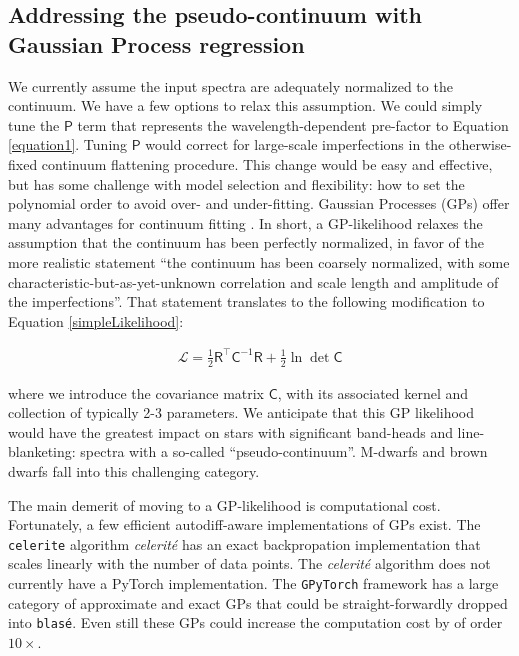 \documentclass[twocolumn]{aastex631}
\begin{document}
\subsection{Addressing the pseudo-continuum with Gaussian Process regression}

We currently assume the input spectra are adequately normalized to the continuum.  We have a few options to relax this assumption.  We could  simply tune the $\mathsf{P}$ term that represents the wavelength-dependent pre-factor to Equation \ref{equation1}.  Tuning $\mathsf{P}$ would correct for large-scale imperfections in the otherwise-fixed continuum flattening procedure.  This change would be easy and effective, but has some challenge with model selection and flexibility: how to set the polynomial order to avoid over- and under-fitting.  Gaussian Processes (GPs) offer many advantages for continuum fitting \citep{czekala15}.  In short, a GP-likelihood relaxes the assumption that the continuum has been perfectly normalized, in favor of the more realistic statement ``the continuum has been coarsely normalized, with some characteristic-but-as-yet-unknown correlation and scale length and amplitude of the imperfections''.  That statement translates to the following modification to Equation \ref{simpleLikelihood}:

\begin{eqnarray}
    \mathcal{L} =  \frac{1}{2}\mathsf{R^\intercal} \mathsf{C}^{-1} \mathsf{R} +\frac{1}{2}\ln{\det{\mathsf{C}}} \label{GPLikelihood}
\end{eqnarray}

where we introduce the covariance matrix $\mathsf{C}$, with its associated kernel and collection of typically 2-3 parameters.  We anticipate that this GP likelihood would have the greatest impact on stars with significant band-heads and line-blanketing: spectra with a so-called ``pseudo-continuum''.  M-dwarfs and brown dwarfs fall into this challenging category.

The main demerit of moving to a GP-likelihood is computational cost.  Fortunately, a few efficient autodiff-aware implementations of GPs exist. The \texttt{celerite} algorithm \emph{celerit\'e} \citep{2017AJ....154..220F} has an exact backpropation implementation \citep{2018RNAAS...2...31F} that scales linearly with the number of data points.  The \emph{celerit\'e} algorithm does not currently have a PyTorch implementation.  The \texttt{GPyTorch} framework \citep{2018arXiv180911165G} has a large category of approximate and exact GPs that could be straight-forwardly dropped into \texttt{blas\'e}.  Even still these GPs could increase the computation cost by of order $10\times$.
\end{document}
